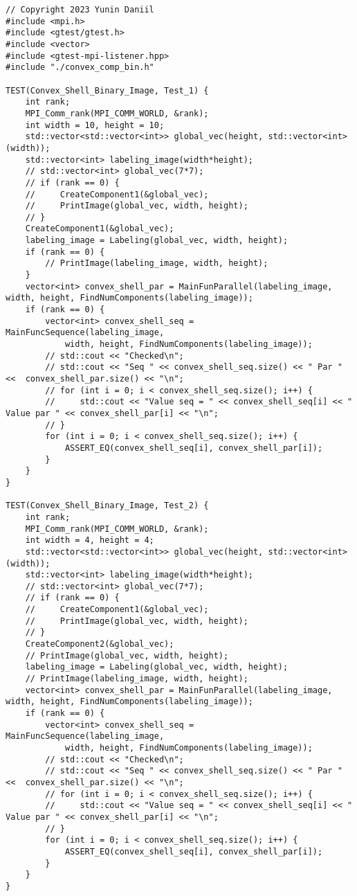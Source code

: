 \documentclass{report}
\begin{document}
\begin{lstlisting}
// Copyright 2023 Yunin Daniil
#include <mpi.h>
#include <gtest/gtest.h>
#include <vector>
#include <gtest-mpi-listener.hpp>
#include "./convex_comp_bin.h"

TEST(Convex_Shell_Binary_Image, Test_1) {
    int rank;
    MPI_Comm_rank(MPI_COMM_WORLD, &rank);
    int width = 10, height = 10;
    std::vector<std::vector<int>> global_vec(height, std::vector<int>(width));
    std::vector<int> labeling_image(width*height);
    // std::vector<int> global_vec(7*7);
    // if (rank == 0) {
    //     CreateComponent1(&global_vec);
    //     PrintImage(global_vec, width, height);
    // }
    CreateComponent1(&global_vec);
    labeling_image = Labeling(global_vec, width, height);
    if (rank == 0) {
        // PrintImage(labeling_image, width, height);
    }
    vector<int> convex_shell_par = MainFunParallel(labeling_image, width, height, FindNumComponents(labeling_image));
    if (rank == 0) {
        vector<int> convex_shell_seq = MainFuncSequence(labeling_image,
            width, height, FindNumComponents(labeling_image));
        // std::cout << "Checked\n";
        // std::cout << "Seq " << convex_shell_seq.size() << " Par " <<  convex_shell_par.size() << "\n";
        // for (int i = 0; i < convex_shell_seq.size(); i++) {
        //     std::cout << "Value seq = " << convex_shell_seq[i] << " Value par " << convex_shell_par[i] << "\n";
        // }
        for (int i = 0; i < convex_shell_seq.size(); i++) {
            ASSERT_EQ(convex_shell_seq[i], convex_shell_par[i]);
        }
    }
}

TEST(Convex_Shell_Binary_Image, Test_2) {
    int rank;
    MPI_Comm_rank(MPI_COMM_WORLD, &rank);
    int width = 4, height = 4;
    std::vector<std::vector<int>> global_vec(height, std::vector<int>(width));
    std::vector<int> labeling_image(width*height);
    // std::vector<int> global_vec(7*7);
    // if (rank == 0) {
    //     CreateComponent1(&global_vec);
    //     PrintImage(global_vec, width, height);
    // }
    CreateComponent2(&global_vec);
    // PrintImage(global_vec, width, height);
    labeling_image = Labeling(global_vec, width, height);
    // PrintImage(labeling_image, width, height);
    vector<int> convex_shell_par = MainFunParallel(labeling_image, width, height, FindNumComponents(labeling_image));
    if (rank == 0) {
        vector<int> convex_shell_seq = MainFuncSequence(labeling_image,
            width, height, FindNumComponents(labeling_image));
        // std::cout << "Checked\n";
        // std::cout << "Seq " << convex_shell_seq.size() << " Par " <<  convex_shell_par.size() << "\n";
        // for (int i = 0; i < convex_shell_seq.size(); i++) {
        //     std::cout << "Value seq = " << convex_shell_seq[i] << " Value par " << convex_shell_par[i] << "\n";
        // }
        for (int i = 0; i < convex_shell_seq.size(); i++) {
            ASSERT_EQ(convex_shell_seq[i], convex_shell_par[i]);
        }
    }
}


\end{lstlisting}
\end{document}
